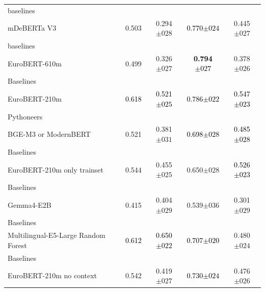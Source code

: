 \begin{tabularx}{\textwidth}{X | c c c c}
baselines\\\subcatarrow{}mDeBERTa V3 & \textcolor{White!50!NavyBlue}{0.503} & \textcolor{NavyBlue}{0.294$\pm{}028$} & \textcolor{Black}{0.770$\pm{}024$} & \textcolor{White!50!NavyBlue}{0.445$\pm{}027$} \\
baselines\\\subcatarrow{}EuroBERT-610m & \textcolor{White!50!NavyBlue}{0.499} & \textcolor{NavyBlue}{0.326$\pm{}027$} & \textbf{\textcolor{Black}{0.794$\pm{}027$}} & \textcolor{White!50!NavyBlue}{0.378$\pm{}026$} \\
Baselines\\\subcatarrow{}EuroBERT-210m & \textcolor{Black}{0.618} & \textcolor{Black}{0.521$\pm{}025$} & \textcolor{Black}{0.786$\pm{}022$} & \textcolor{Black}{0.547$\pm{}023$} \\
Pythoneers\\\subcatarrow{}BGE-M3 or ModernBERT & \textcolor{White!50!NavyBlue}{0.521} & \textcolor{White!50!NavyBlue}{0.381$\pm{}031$} & \textcolor{Black}{0.698$\pm{}028$} & \textcolor{Black}{0.485$\pm{}028$} \\
Baselines\\\subcatarrow{}EuroBERT-210m only trainset & \textcolor{White!50!NavyBlue}{0.544} & \textcolor{White!50!NavyBlue}{0.455$\pm{}025$} & \textcolor{White!50!NavyBlue}{0.650$\pm{}028$} & \textcolor{Black}{0.526$\pm{}023$} \\
Baselines\\\subcatarrow{}Gemma4-E2B & \textcolor{NavyBlue}{0.415} & \textcolor{White!50!NavyBlue}{0.404$\pm{}029$} & \textcolor{NavyBlue}{0.539$\pm{}036$} & \textcolor{NavyBlue}{0.301$\pm{}029$} \\
Baselines\\\subcatarrow{}Multilingual-E5-Large Random Forest & \textcolor{Black}{0.612} & \textcolor{Black}{0.650$\pm{}022$} & \textcolor{Black}{0.707$\pm{}020$} & \textcolor{White!50!NavyBlue}{0.480$\pm{}024$} \\
Baselines\\\subcatarrow{}EuroBERT-210m no context & \textcolor{White!50!NavyBlue}{0.542} & \textcolor{White!50!NavyBlue}{0.419$\pm{}027$} & \textcolor{Black}{0.730$\pm{}024$} & \textcolor{White!50!NavyBlue}{0.476$\pm{}026$} \\
\hline
\end{tabularx}